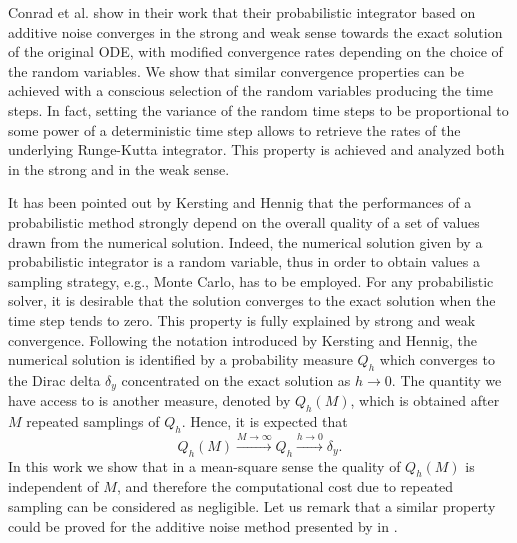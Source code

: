 \documentclass{siamart1116}
\numberwithin{theorem}{section}
\newcommand{\rightarrowtext}[1]{\ensuremath{\stackrel{#1}{\longrightarrow}}}
\newcommand{\corr}[1]{{\color{bordeaux}#1}}
\begin{document}
\corr{Conrad et al. show in their work that their probabilistic integrator based on additive noise converges in the strong and weak sense towards the exact solution of the original ODE, with modified convergence rates depending on the choice of the random variables. We show that similar convergence properties can be achieved with a conscious selection of the random variables producing the time steps.} In fact, setting the variance of the random time steps to be proportional to some power of a deterministic time step allows to retrieve the rates of the underlying Runge-Kutta integrator. This property is achieved and analyzed both in the strong and in the weak sense. 

It has been pointed out by Kersting and Hennig \cite{KeH16} that the performances of a probabilistic method strongly depend on the overall quality of a set of values drawn from the numerical solution. \corr{Indeed, the numerical solution given by a probabilistic integrator is a random variable, thus in order to obtain values a sampling strategy, e.g., Monte Carlo, has to be employed.} For any probabilistic solver, it is desirable that the solution converges to the exact solution when the time step tends to zero. This property is fully explained by strong and weak convergence. Following the notation introduced by Kersting and Hennig, the numerical solution is identified by a probability measure $Q_h$ which converges to the Dirac delta $\delta_y$ concentrated on the exact solution as $h\to 0$. The quantity we have access to is another measure, denoted by $Q_h(M)$, which is obtained after $M$ repeated samplings of $Q_h$. Hence, it is expected that
\begin{equation}
Q_h(M) \rightarrowtext{M\to\infty} Q_h \rightarrowtext{h\to 0} \delta_y.
\end{equation}
In this work we show that in a mean-square sense the quality of $Q_h(M)$ is independent of $M$, and therefore the computational cost due to repeated sampling can be considered as negligible. \corr{Let us remark that a similar property could be proved for the additive noise method presented by in \cite{CGS16}.}
\end{document}
